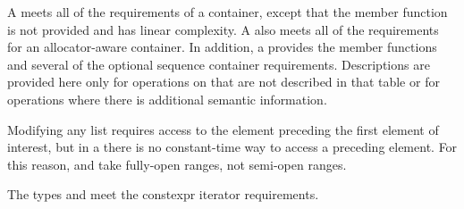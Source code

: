 \pnum
A  meets all of the requirements
of a container,
except that the  member function is not provided and
 has linear complexity.
A  also meets all of the requirements
for an allocator-aware container.
In addition, a 
provides the  member functions and
several of the optional sequence container requirements.
Descriptions are provided here only for operations on
 that are not described in that table or for operations where there
is additional semantic information.

\pnum
\begin{note}
Modifying any list requires access to the element preceding the first element
of interest, but in a  there is no constant-time way to access a
preceding element.
For this reason,  and 
take fully-open ranges, not semi-open ranges.
\end{note}

\pnum
The types  and  meet
the constexpr iterator requirements.

